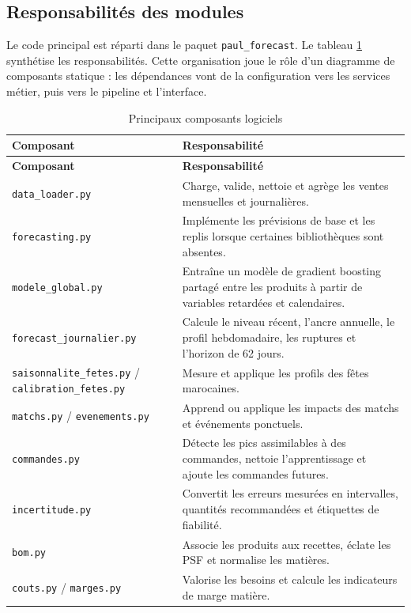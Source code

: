 \subsection{Responsabilités des modules}

Le code principal est réparti dans le paquet \texttt{paul\_forecast}. Le tableau
\ref{tab:modules} synthétise les responsabilités. Cette organisation joue le rôle
d'un diagramme de composants statique : les dépendances vont de la configuration
vers les services métier, puis vers le pipeline et l'interface.

\small
\begin{longtable}{p{4.5cm}p{9.9cm}}
\caption{Principaux composants logiciels}\label{tab:modules}\\
\toprule
\textbf{Composant} & \textbf{Responsabilité} \\
\midrule
\endfirsthead
\toprule
\textbf{Composant} & \textbf{Responsabilité} \\
\midrule
\endhead
\texttt{data\_loader.py} & Charge, valide, nettoie et agrège les ventes mensuelles et journalières. \\
\texttt{forecasting.py} & Implémente les prévisions de base et les replis lorsque certaines bibliothèques sont absentes. \\
\texttt{modele\_global.py} & Entraîne un modèle de gradient boosting partagé entre les produits à partir de variables retardées et calendaires. \\
\texttt{forecast\_journalier.py} & Calcule le niveau récent, l'ancre annuelle, le profil hebdomadaire, les ruptures et l'horizon de 62 jours. \\
\texttt{saisonnalite\_fetes.py} / \texttt{calibration\_fetes.py} & Mesure et applique les profils des fêtes marocaines. \\
\texttt{matchs.py} / \texttt{evenements.py} & Apprend ou applique les impacts des matchs et événements ponctuels. \\
\texttt{commandes.py} & Détecte les pics assimilables à des commandes, nettoie l'apprentissage et ajoute les commandes futures. \\
\texttt{incertitude.py} & Convertit les erreurs mesurées en intervalles, quantités recommandées et étiquettes de fiabilité. \\
\texttt{bom.py} & Associe les produits aux recettes, éclate les PSF et normalise les matières. \\
\texttt{couts.py} / \texttt{marges.py} & Valorise les besoins et calcule les indicateurs de marge matière. \\

\end{longtable}
